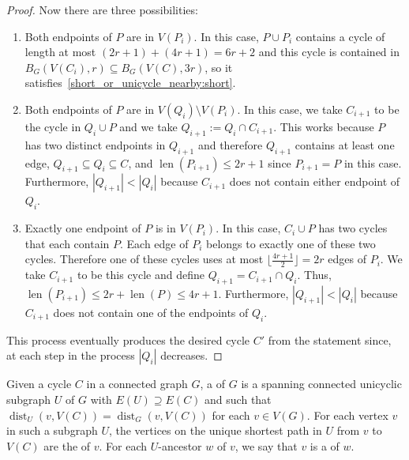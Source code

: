 \documentclass{patmorin}
\DeclareMathOperator{\len}{len}
\DeclareMathOperator{\dist}{dist}
\begin{document}
\begin{proof}
  Now there are three possibilities:
  \begin{enumerate}
    \item Both endpoints of $P$ are in $V(P_{i})$.
    In this case, $P\cup P_{i}$ contains a cycle of length at most
    $(2r+1)+(4r+1)=6r+2$ and this cycle is contained in $B_G(V(C_i),r)\subseteq B_G(V(C),3r)$, so it satisfies~\eqref{short_or_unicycle_nearby:short}.
    \item Both endpoints of $P$ are in $V(Q_{i})\setminus V(P_{i})$.
    In this case, we take $C_{i+1}$ to be the cycle     
    in $Q_{i}\cup P$ and
    we take $Q_{i+1}:= Q_i\cap C_{i+1}$. %
    This works because $P$ has two distinct endpoints in $Q_{i+1}$
    and therefore $Q_{i+1}$ contains at least one edge,
    $Q_{i+1}\subseteq Q_i\subseteq C$, and     
    $\len(P_{i+1})\leq 2r+1$ since $P_{i+1}=P$ in this case.     
    Furthermore, $|Q_{i+1}| < |Q_{i}|$ because $C_{i+1}$ does not contain either endpoint of $Q_{i}$.
    \item Exactly one endpoint of $P$ is in $V(P_{i})$.
    In this case, $C_{i}\cup P$ has two cycles that each contain $P$.
    Each edge of $P_{i}$ belongs to exactly one of these two cycles.
    Therefore one of these cycles uses at most $\lfloor\frac{4r+1}{2}\rfloor=2r$ edges of $P_{i}$.
    We take $C_{i+1}$ to be this cycle and define
    $Q_{i+1}=C_{i+1}\cap Q_i$. %
    Thus, $\len(P_{i+1}) \leq 2r+\len(P)\leq 4r+1$.
    Furthermore, $|Q_{i+1}| < |Q_{i}|$ because $C_{i+1}$ does not contain one of the endpoints of $Q_{i}$.
  \end{enumerate}
  This process eventually produces the desired cycle $C'$ from the statement since, at each step in the process $|Q_i|$ decreases.
\end{proof}

Given a cycle $C$ in a connected graph $G$, a  of $G$ is a spanning connected unicyclic subgraph $U$ of $G$ with $E(U)\supseteq E(C)$ and such that $\dist_U(v,V(C))=\dist_G(v,V(C))$ for each $v\in V(G)$.  For each vertex $v$ in such a subgraph $U$, the vertices on the unique shortest path in $U$ from $v$ to $V(C)$ are the  of $v$.  For each $U$-ancestor $w$ of $v$, we say that $v$ is a  of $w$.
\end{document}
